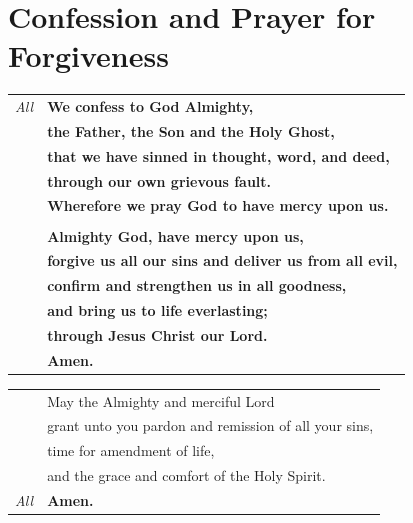 \documentclass[10pt]{article}
\begin{document}
\newpage
\section*{Confession and Prayer for Forgiveness}

\begin{tabularx}{\linewidth}{lX}

    \textit{All} & \textbf{We confess to God Almighty,} \\
    & \textbf{the Father, the Son and the Holy Ghost,} \\
    & \textbf{that we have sinned in thought, word, and deed,} \\
    & \textbf{through our own grievous fault.} \\
    & \textbf{Wherefore we pray God to have mercy upon us.} \\
    & \\
    & \textbf{Almighty God, have mercy upon us,} \\
    & \textbf{forgive us all our sins and deliver us from all evil,} \\
    & \textbf{confirm and strengthen us in all goodness,} \\
    & \textbf{and bring us to life everlasting;} \\
    & \textbf{through Jesus Christ our Lord.} \\
    & \textbf{Amen.}

\end{tabularx}


\begin{tabularx}{\linewidth}{lX}
    & May the Almighty and merciful Lord \\
    & grant unto you pardon and remission of all your sins, \\
    & time for amendment of life, \\
    & and the grace and comfort of the Holy Spirit. \\
    \textit{All} & \textbf{Amen.}
\end{tabularx}
\end{document}
